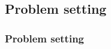 \subsection{Problem setting}

\begin{frame}
\frametitle{Problem setting}
\begin{center}
\end{center}
\end{frame}



  
